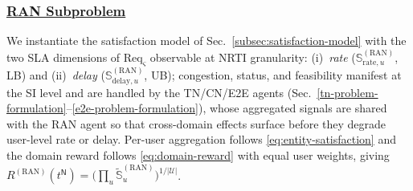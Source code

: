 \documentclass[12pt,lettersize,journal,onecolumn]{IEEEtran}
\begin{document}
\subsubsection{\underline{RAN Subproblem}} \label{ran-problem-formulation}
We instantiate the satisfaction model of Sec.~\ref{subsec:satisfaction-model} with the two SLA dimensions of $\mathrm{Req}_{\varsigma}$ observable at NRTI granularity: (i)~\textit{rate} ($\mathbb{S}^{\mathrm{(RAN)}}_{\mathrm{rate},u}$, LB) and (ii)~\textit{delay} ($\mathbb{S}^{\mathrm{(RAN)}}_{\mathrm{delay},u}$, UB); congestion, status, and feasibility manifest at the SI level and are handled by the TN/CN/E2E agents (Sec.~\ref{tn-problem-formulation}--\ref{e2e-problem-formulation}), whose aggregated signals are shared with the RAN agent so that cross-domain effects surface before they degrade user-level rate or delay. Per-user aggregation follows \eqref{eq:entity-satisfaction} and the domain reward follows \eqref{eq:domain-reward} with equal user weights, giving $R^{\mathrm{(RAN)}}(t^\mathsf{N})=\bigl(\prod_{u}\tilde{\mathbb{S}}^{\mathrm{(RAN)}}_{u}\bigr)^{1/|\mathcal{U}|}$. 
\end{document}

